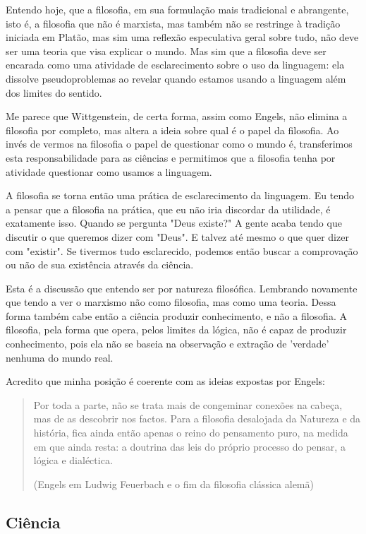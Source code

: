 Entendo hoje, que a filosofia, em sua formulação mais tradicional e abrangente, isto é, a filosofia que não é marxista, mas também não se restringe à tradição iniciada em Platão, mas sim uma reflexão especulativa geral sobre tudo, não deve ser uma teoria que visa explicar o mundo. Mas sim que a filosofia deve ser encarada como uma atividade de esclarecimento sobre o uso da linguagem: ela dissolve pseudoproblemas ao revelar quando estamos usando a linguagem além dos limites do sentido.

Me parece que Wittgenstein, de certa forma, assim como Engels, não elimina a filosofia por completo, mas altera a ideia sobre qual é o papel da filosofia. Ao invés de vermos na filosofia o papel de questionar como o mundo é, transferimos esta responsabilidade para as ciências e permitimos que a filosofia tenha por atividade questionar como usamos a linguagem.

A filosofia se torna então uma prática de esclarecimento da linguagem. Eu tendo a pensar que a filosofia na prática, que eu não iria discordar da utilidade, é exatamente isso. Quando se pergunta "Deus existe?" A gente acaba tendo que discutir o que queremos dizer com "Deus". E talvez até mesmo o que quer dizer com "existir". Se tivermos tudo esclarecido, podemos então buscar a comprovação ou não de sua existência através da ciência. 

Esta é a discussão que entendo ser por natureza filosófica. Lembrando novamente que tendo a ver o marxismo não como filosofia, mas como uma teoria. Dessa forma também cabe então a ciência produzir conhecimento, e não a filosofia. A filosofia, pela forma que opera, pelos limites da lógica, não é capaz de produzir conhecimento, pois ela não se baseia na observação e extração de 'verdade' nenhuma do mundo real. 

Acredito que minha posição é coerente com as ideias expostas por Engels:

\begin{quote}
Por toda a parte, não se trata mais de congeminar conexões na cabeça, mas de as descobrir nos factos. Para a filosofia desalojada da Natureza e da história, fica ainda então apenas o reino do pensamento puro, na medida em que ainda resta: a doutrina das leis do próprio processo do pensar, a lógica e dialéctica.

(Engels em Ludwig Feuerbach e o fim da filosofia clássica alemã)
\end{quote}

\subsection{Ciência}

